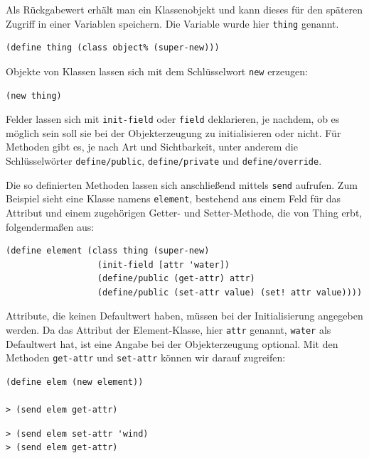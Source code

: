 Als Rückgabewert erhält man ein Klassenobjekt und kann dieses für den späteren Zugriff in einer Variablen speichern. Die Variable wurde hier \texttt{thing} genannt.

\begin{lstlisting}
(define thing (class object% (super-new)))
\end{lstlisting}

Objekte von Klassen lassen sich mit dem Schlüsselwort \texttt{new} erzeugen:

\begin{lstlisting}
(new thing)
\end{lstlisting}

Felder lassen sich mit \texttt{init-field} oder \texttt{field} deklarieren, je nachdem, ob es möglich sein soll sie bei der Objekterzeugung zu initialisieren oder nicht. Für Methoden gibt es, je nach Art und Sichtbarkeit, unter anderem die Schlüsselwörter \texttt{define/public}, \texttt{define/private} und \texttt{define/override}. 

Die so definierten Methoden lassen sich anschließend mittels \texttt{send} aufrufen. Zum Beispiel sieht eine Klasse namens \texttt{element}, bestehend aus einem Feld für das Attribut und einem zugehörigen Getter- und Setter-Methode, die von Thing erbt, folgendermaßen aus:

\begin{lstlisting}
(define element (class thing (super-new)
                  (init-field [attr 'water])
                  (define/public (get-attr) attr)
                  (define/public (set-attr value) (set! attr value))))  
\end{lstlisting}

Attribute, die keinen Defaultwert haben, müssen bei der Initialisierung angegeben werden. Da das Attribut der Element-Klasse, hier \texttt{attr} genannt, \texttt{{\textquotesingle}water} als Defaultwert hat, ist eine Angabe bei der Objekterzeugung optional. Mit den Methoden \texttt{get-attr} und \texttt{set-attr} können wir darauf zugreifen:


\begin{lstlisting}
(define elem (new element))

> (send elem get-attr)
\end{lstlisting} 
{}

\begin{lstlisting}
> (send elem set-attr 'wind)
> (send elem get-attr)
\end{lstlisting} 
{}
% 
% 

